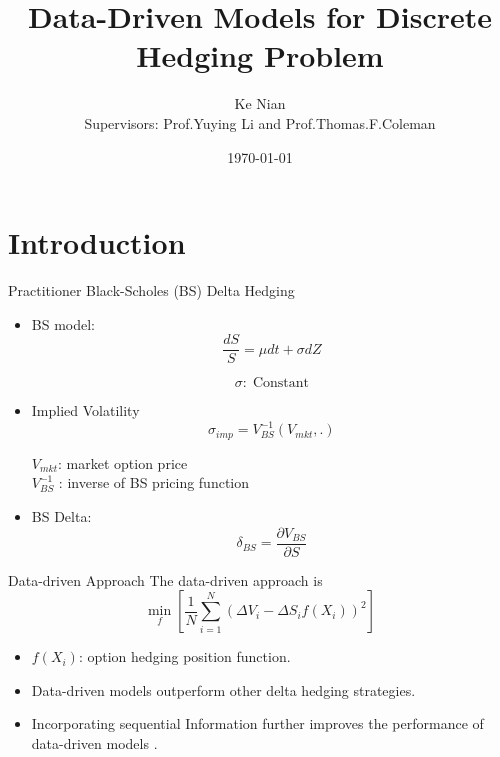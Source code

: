 \documentclass[10pt,table,mathserif]{beamer}
\title[Data-Driven Models for Discrete
Hedging Problem ]%
{Data-Driven Models for   Discrete
Hedging Problem}
\author[Ke Nian ] %
{ Ke Nian\\
 Supervisors: Prof.Yuying Li and Prof.Thomas.F.Coleman
}
\institute[
  David R. Cheriton School of Computer Science, University of Waterloo
] %
{%
  David R. Cheriton School of Computer Science,\\
  University of Waterloo,\\
  Waterloo, Canada
}
\date{\today}
\begin{document}
\begin{frame}[plain] %
  \titlepage
\end{frame}


\section{Introduction}

\begin{frame}{Practitioner Black-Scholes (BS) Delta Hedging}

\begin{itemize}
  \item BS model:
\[
\frac{d S}{ S}= \mu dt +\sigma dZ
\]

\[
\sigma:\; \text{Constant}
\]
\item Implied Volatility
  \[
  \sigma_{imp}=V_{BS}^{-1}(V_{mkt},.)
  \]
  \begin{center}
  $V_{mkt}$: market option price \\ $V_{BS}^{-1}$ : inverse of BS pricing function
  \end{center}

\item BS Delta:
\[
\delta_{BS}=\frac{\partial V_{BS}}{ \partial S}
\]
\end{itemize}

\end{frame}


\begin{frame}{Data-driven Approach}
The  data-driven approach is
\[
\min_{f}\left[\frac{1}{N} \sum_{i=1}^N (\Delta V_i-\Delta S_i f(X_i))^2 \right]
\]

\begin{itemize}
  \item $f(X_i)$: option hedging position function.
  \item Data-driven models outperform other delta hedging strategies\footnotemark.
  \item Incorporating sequential Information further improves the performance of  data-driven models \footnotemark.
\end{itemize}

\end{frame}
\end{document}

